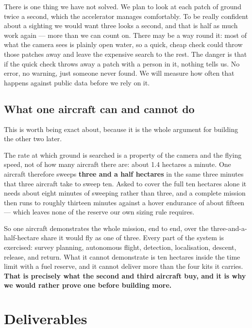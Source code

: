 \documentclass[11pt,a4paper]{article}
\begin{document}
There is one thing we have not solved. We plan to look at each patch of ground
twice a second, which the accelerator manages comfortably. To be really
confident about a sighting we would want three looks a second, and that is half
as much work again --- more than we can count on. There may be a way round it:
most of what the camera sees is plainly open water, so a quick, cheap check
could throw those patches away and leave the expensive search to the rest. The
danger is that if the quick check throws away a patch with a person in it,
nothing tells us. No error, no warning, just someone never found. We will
measure how often that happens against public data before we rely on it.

\subsection{What one aircraft can and cannot do}

This is worth being exact about, because it is the whole argument for building
the other two later.

The rate at which ground is searched is a property of the camera and the flying
speed, not of how many aircraft there are: about 1.4 hectares a minute. One
aircraft therefore sweeps \textbf{three and a half hectares} in the same three
minutes that three aircraft take to sweep ten. Asked to cover the full ten
hectares alone it needs about eight minutes of sweeping rather than three, and
a complete mission then runs to roughly thirteen minutes against a hover
endurance of about fifteen --- which leaves none of the reserve our own sizing
rule requires.

So one aircraft demonstrates the whole mission, end to end, over the
three-and-a-half-hectare share it would fly as one of three. Every part of the
system is exercised: survey planning, autonomous flight, detection,
localisation, descent, release, and return. What it cannot demonstrate is ten
hectares inside the time limit with a fuel reserve, and it cannot deliver more
than the four kits it carries. \textbf{That is precisely what the second and
third aircraft buy, and it is why we would rather prove one before building more.}

\section{Deliverables}
\end{document}
